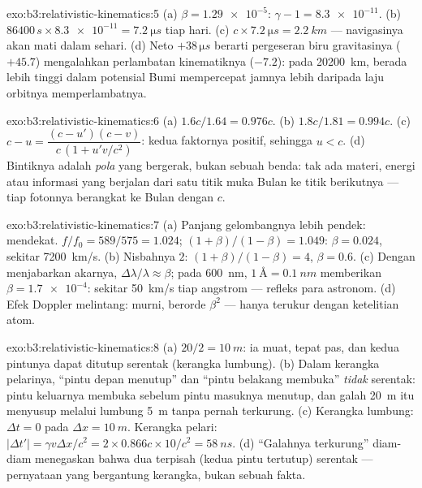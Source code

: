 \begin{solution}{exo:b3:relativistic-kinematics:5}
(a) $\beta = \num{1.29e-5}$: $\gamma - 1 = \num{8.3e-11}$. (b)
$86400\,\unit{s} \times \num{8.3e-11} = \qty{7.2}{\micro s}$ tiap hari.
(c) $c \times \qty{7.2}{\micro s} = \qty{2.2}{km}$ --- navigasinya
akan mati dalam sehari. (d) Neto $+38\,\unit{\micro s}$ berarti
pergeseran biru gravitasinya ($+45.7$) mengalahkan perlambatan
kinematiknya ($-7.2$): pada \qty{20200}{km}, berada lebih tinggi dalam
potensial Bumi mempercepat jamnya lebih daripada laju orbitnya
memperlambatnya.
\end{solution}

\begin{solution}{exo:b3:relativistic-kinematics:6}
(a) $1.6c/1.64 = 0.976c$. (b) $1.8c/1.81 = 0.994c$. (c) $c - u =
\dfrac{(c - u')(c - v)}{c\,(1 + u'v/c^2)}$: kedua faktornya positif,
sehingga $u < c$. (d) Bintiknya adalah \emph{pola} yang bergerak, bukan
sebuah benda: tak ada materi, energi atau informasi yang berjalan dari
satu titik muka Bulan ke titik berikutnya --- tiap fotonnya berangkat ke
Bulan dengan $c$.
\end{solution}

\begin{solution}{exo:b3:relativistic-kinematics:7}
(a) Panjang gelombangnya lebih pendek: mendekat. $f/f_0 = 589/575 = 1.024$;
$(1+\beta)/(1-\beta) = 1.049$: $\beta = 0.024$, sekitar
\qty{7200}{km/s}. (b) Nisbahnya $2$: $(1+\beta)/(1-\beta) = 4$, $\beta =
0.6$. (c) Dengan menjabarkan akarnya, $\Delta\lambda/\lambda \approx
\beta$; pada \qty{600}{nm}, $\qty{1}{\angstrom} = \qty{0.1}{nm}$ memberikan
$\beta = \num{1.7e-4}$: sekitar \qty{50}{km/s} tiap angstrom --- refleks
para astronom. (d) Efek Doppler melintang:  murni,
berorde $\beta^2$ --- hanya terukur dengan ketelitian atom.
\end{solution}

\begin{solution}{exo:b3:relativistic-kinematics:8}
(a) $20/2 = \qty{10}{m}$: ia muat, tepat pas, dan kedua pintunya dapat
ditutup serentak (kerangka lumbung). (b) Dalam kerangka pelarinya,
 ``pintu depan menutup'' dan ``pintu belakang membuka''
\emph{tidak} serentak: pintu keluarnya membuka sebelum pintu masuknya
menutup, dan galah \qty{20}{m} itu menyusup melalui lumbung \qty{5}{m}
tanpa pernah terkurung. (c) Kerangka lumbung: $\Delta t = 0$ pada $\Delta x =
\qty{10}{m}$. Kerangka pelari: $|\Delta t'| = \gamma v\Delta x/c^2 =
2 \times 0.866c \times 10/c^2 = \qty{58}{ns}$. (d) ``Galahnya
terkurung'' diam-diam menegaskan bahwa dua  terpisah (kedua
pintu tertutup) serentak --- pernyataan yang bergantung kerangka, bukan
sebuah fakta.
\end{solution}

